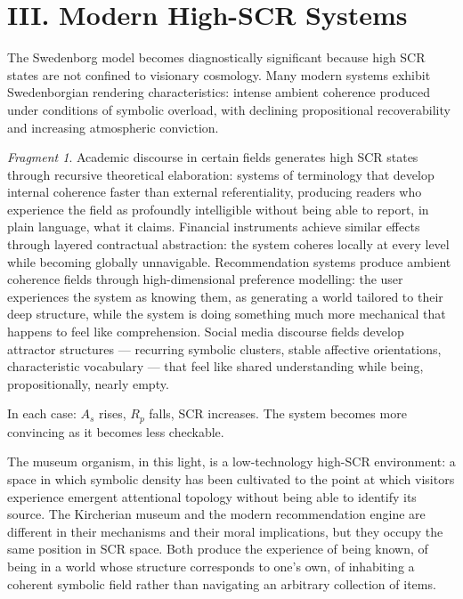 \documentclass[12pt, a4paper, twoside]{memoir}
\theoremstyle{definition}
\theoremstyle{remark}
\newtheorem{fragment}{Fragment}[chapter]
\begin{document}
\section*{III. Modern High-SCR Systems}

The Swedenborg model becomes diagnostically significant because high SCR states are not confined to visionary cosmology. Many modern systems exhibit Swedenborgian rendering characteristics: intense ambient coherence produced under conditions of symbolic overload, with declining propositional recoverability and increasing atmospheric conviction.

\begin{fragment}
Academic discourse in certain fields generates high SCR states through recursive theoretical elaboration: systems of terminology that develop internal coherence faster than external referentiality, producing readers who experience the field as profoundly intelligible without being able to report, in plain language, what it claims. Financial instruments achieve similar effects through layered contractual abstraction: the system coheres locally at every level while becoming globally unnavigable. Recommendation systems produce ambient coherence fields through high-dimensional preference modelling: the user experiences the system as knowing them, as generating a world tailored to their deep structure, while the system is doing something much more mechanical that happens to feel like comprehension. Social media discourse fields develop attractor structures --- recurring symbolic clusters, stable affective orientations, characteristic vocabulary --- that feel like shared understanding while being, propositionally, nearly empty.

In each case: $A_s$ rises, $R_p$ falls, SCR increases. The system becomes more convincing as it becomes less checkable.
\end{fragment}

The museum organism, in this light, is a low-technology high-SCR environment: a space in which symbolic density has been cultivated to the point at which visitors experience emergent attentional topology without being able to identify its source. The Kircherian museum and the modern recommendation engine are different in their mechanisms and their moral implications, but they occupy the same position in SCR space. Both produce the experience of being known, of being in a world whose structure corresponds to one's own, of inhabiting a coherent symbolic field rather than navigating an arbitrary collection of items.
\end{document}
